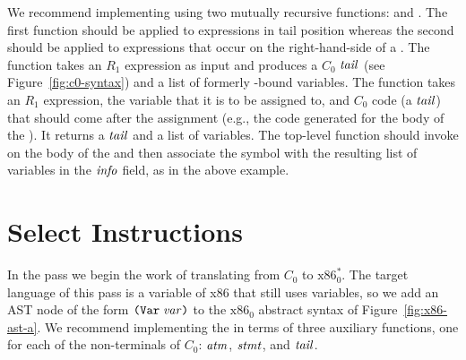 \documentclass[11pt]{book}
\begin{document}
We recommend implementing  using two mutually
recursive functions:  and
.  The first function should be applied to
expressions in tail position whereas the second should be applied to
expressions that occur on the right-hand-side of a . The
 function takes an $R_1$ expression as input and
produces a $C_0$ $\mathit{tail}$ (see Figure~\ref{fig:c0-syntax}) and a list
of formerly -bound variables. The 
function takes an $R_1$ expression, the variable that it is to be
assigned to, and $C_0$ code (a $\mathit{tail}$) that should come after the
assignment (e.g., the code generated for the body of the ).
It returns a $\mathit{tail}$ and a list of variables. The top-level
 function should invoke 
on the body of the  and then associate the 
symbol with the resulting list of variables in the $\mathit{info}$ field,
as in the above example.




\section{Select Instructions}
\label{sec:select-r1}

In the  pass we begin the work of
translating from $C_0$ to $\text{x86}^{*}_0$. The target language of
this pass is a variable of x86 that still uses variables, so we add an
AST node of the form $\texttt{(Var}\;\mathit{var}\texttt{)}$ to the $\text{x86}_0$ abstract
syntax of Figure~\ref{fig:x86-ast-a}.  We recommend implementing the
 in terms of three auxiliary functions, one
for each of the non-terminals of $C_0$: $\mathit{atm}$, $\mathit{stmt}$, and $\mathit{tail}$.
\end{document}
